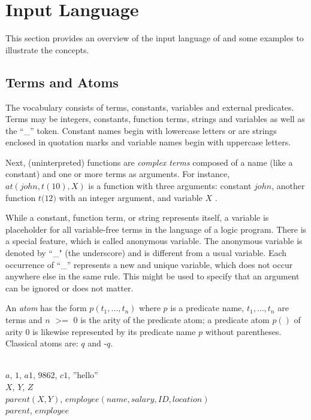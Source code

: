 \documentclass[a4paper, titlepage]{article}
\DeclareMathOperator{\geeq}{>=}
\begin{document}
\section{Input Language}%
\label{sec:inputLang}
This section provides an overview of the input language of 
\dlvhex{} and some examples to illustrate the concepts. 

\subsection{Terms and Atoms}
The vocabulary consists of terms, constants, variables and 
external predicates. Terms may be integers, constants, function terms, 
strings and variables as well as the \enquote{\_} token. 
Constant names begin with lowercase letters or are strings 
enclosed in quotation marks and variable names begin with 
uppercase letters.

Next, (uninterpreted) functions are \emph{complex terms} composed of a name
(like a constant) and one or more terms as arguments.
For instance,
$\mathit{at(john,t(10),X)}$ is a function with three arguments: constant $\mathit{john}$,
another function $\mathit{t(12})$ with an integer argument, and variable $X$ \cite{gkklorst2015}.

While a constant, function term, or string represents itself, a variable is 
placeholder for all variable-free terms in the language of 
a logic program. There is a special feature, which is 
called anonymous variable. The anonymous variable is 
denoted by ``\_" (the underscore) and is different from a 
usual variable. Each occurrence of \enquote{\_} represents 
a new and unique variable, which does not occur anywhere 
else in the same rule. This might be used to specify that 
an argument can be ignored or does not matter.

An \emph{atom} has the form $\mathit{p(t_1,\dots,t_n)}$ where 
$p$ is a predicate name, $t_1,\dots,t_n$ are terms and $n$ 
$\geeq$ $0$ is the arity of the predicate atom; a predicate 
atom $p()$ of arity 0 is likewise represented by its 
predicate name $p$ without parentheses. Classical atoms 
are: $q$ and -$q$.
\begin{exmp}
\text{   }
\\  $a$, $1$, $\mathit{a1}$, 
$\mathit{9862}$, $\mathit{c1}$, ''hello''
\\  $X$, $Y$, $Z$
\\  $\mathit{parent}(X,Y)$, $\mathit{employee}
(name, salary, ID, location)$
\\  $\mathit{parent}$, $\mathit{employee}$
\end{exmp}
\end{document}
